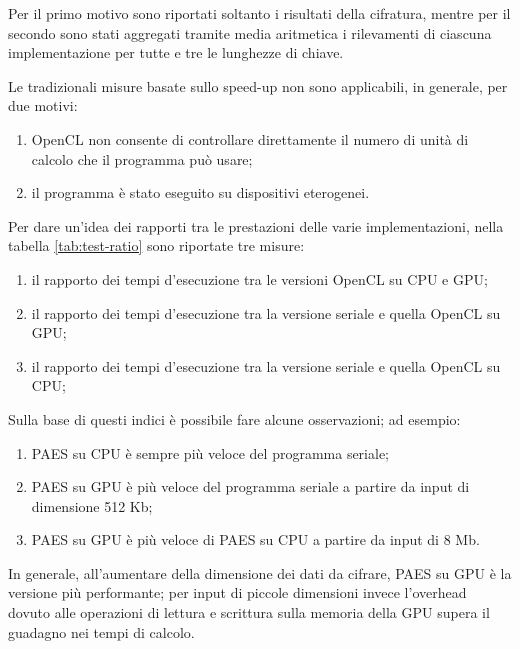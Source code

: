 \documentclass[12pt,a4paper,oneside]{book}
\begin{document}
Per il primo motivo sono riportati soltanto i risultati della cifratura, mentre per il secondo sono stati aggregati tramite media aritmetica i rilevamenti di ciascuna implementazione per tutte e tre le lunghezze di chiave.

Le tradizionali misure basate sullo speed-up non sono applicabili, in generale, per due motivi:
\begin{enumerate}
\item \ac{OpenCL} non consente di controllare direttamente il numero di unità di calcolo che il programma può usare;
\item il programma è stato eseguito su dispositivi eterogenei.
\end{enumerate}

Per dare un'idea dei rapporti tra le prestazioni delle varie implementazioni, nella tabella \ref{tab:test-ratio} sono riportate tre misure:
\begin{enumerate}
\item il rapporto dei tempi d'esecuzione tra le versioni \ac{OpenCL} su \ac{CPU} e \ac{GPU};
\item il rapporto dei tempi d'esecuzione tra la versione seriale e quella \ac{OpenCL} su \ac{GPU};
\item il rapporto dei tempi d'esecuzione tra la versione seriale e quella \ac{OpenCL} su \ac{CPU};
\end{enumerate}

Sulla base di questi indici è possibile fare alcune osservazioni; ad esempio:
\begin{enumerate}
\item PAES su \ac{CPU} è sempre più veloce del programma seriale;
\item PAES su \ac{GPU} è più veloce del programma seriale a partire da input di dimensione 512 Kb;
\item PAES su \ac{GPU} è più veloce di PAES su \ac{CPU} a partire da input di 8 Mb.
\end{enumerate}

In generale, all'aumentare della dimensione dei dati da cifrare, PAES su \ac{GPU} è la versione più performante; per input di piccole dimensioni invece l'overhead dovuto alle operazioni di lettura e scrittura sulla memoria della \ac{GPU} supera il guadagno nei tempi di calcolo.
\end{document}
